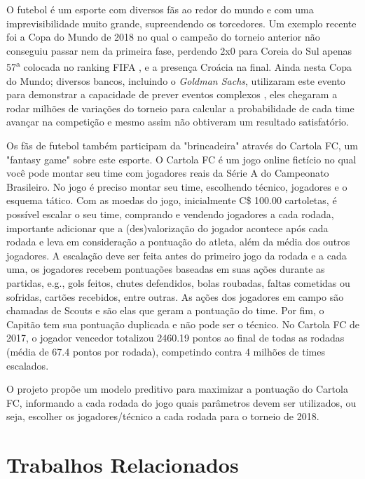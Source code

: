 \documentclass[conference]{IEEEtran}
\newcommand{\tit}[1]{{\textit{#1}}}
\newcommand{\ts}{\textsuperscript}
\begin{document}
O futebol é um esporte com diversos  fãs ao redor do mundo e com uma
imprevisibilidade muito grande, supreendendo os torcedores. Um exemplo
recente foi  a Copa  do Mundo de  2018 no qual  o campeão  do torneio
anterior não conseguiu passar nem da primeira fase, perdendo 2x0 para
Coreia do Sul apenas 57\ts{a}  colocada no ranking FIFA \cite{fifa}, e
a presença  Croácia na  final. Ainda nesta  Copa do  Mundo; diversos
bancos, incluindo  o \tit{Goldman Sachs}, utilizaram  este evento para
demonstrar a capacidade de  prever eventos complexos \cite{news}, eles
chegaram a  rodar milhões de  variações do torneio para  calcular a
probabilidade de cada time avançar na competição e mesmo assim não
obtiveram um resultado satisfatório.

Os fãs  de futebol  também participam  da "brincadeira"  através do
Cartola FC, um  "fantasy game" sobre este esporte. O  Cartola FC é um
jogo online fictício no qual você pode montar seu time com jogadores
reais da Série A do Campeonato  Brasileiro. No jogo é preciso montar
seu time, escolhendo  técnico, jogadores e o esquema  tático. Com as
moedas  do  jogo, inicialmente  C\$  100.00  cartoletas, é  possível
escalar  o seu  time, comprando  e vendendo  jogadores a  cada rodada,
importante  adicionar que  a  (des)valorização  do jogador  acontece
após cada  rodada e leva  em consideração a pontuação  do atleta,
além da  média dos  outros jogadores. A  escalação deve  ser feita
antes do  primeiro jogo da rodada  e a cada uma,  os jogadores recebem
pontuações  baseadas  em suas  ações  durante  as partidas,  e.g.,
gols feitos,  chutes defendidos,  bolas roubadas, faltas  cometidas ou
sofridas, cartões  recebidos, entre outras. As  ações dos jogadores
em campo são  chamadas de Scouts e são elas  que geram a pontuação
do time. Por fim, o Capitão tem sua pontuação duplicada e não pode
ser o  técnico. No Cartola FC  de 2017, o jogador  vencedor totalizou
2460.19 pontos ao final de todas as rodadas (média de 67.4 pontos por
rodada), competindo contra 4 milhões de times escalados.

O projeto propõe um modelo  preditivo para maximizar a pontuação do
Cartola FC, informando  a cada rodada do jogo  quais parâmetros devem
ser utilizados, ou seja, escolher  os jogadores/técnico a cada rodada
para o torneio de 2018.

\section{Trabalhos Relacionados}
\end{document}
